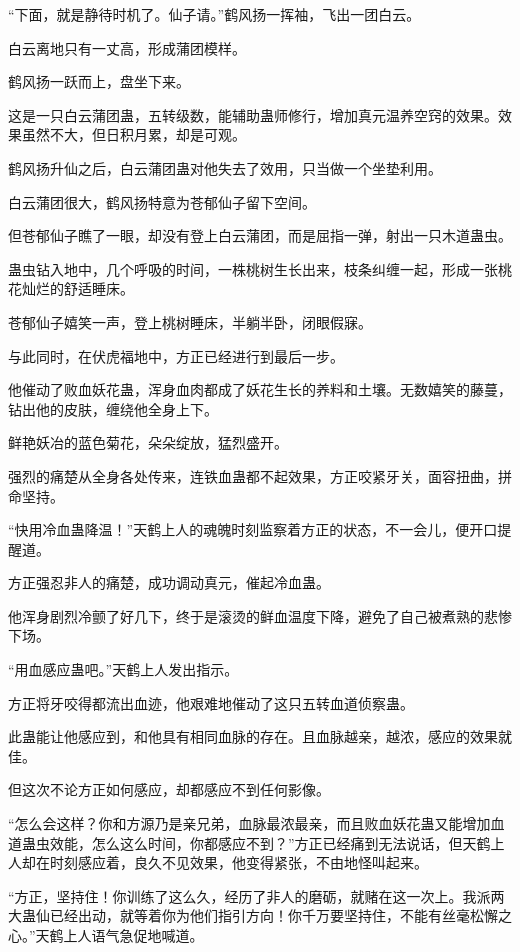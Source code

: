 \begin{this_body}
“下面，就是静待时机了。仙子请。”鹤风扬一挥袖，飞出一团白云。

白云离地只有一丈高，形成蒲团模样。

鹤风扬一跃而上，盘坐下来。

这是一只白云蒲团蛊，五转级数，能辅助蛊师修行，增加真元温养空窍的效果。效果虽然不大，但日积月累，却是可观。

鹤风扬升仙之后，白云蒲团蛊对他失去了效用，只当做一个坐垫利用。

白云蒲团很大，鹤风扬特意为苍郁仙子留下空间。

但苍郁仙子瞧了一眼，却没有登上白云蒲团，而是屈指一弹，射出一只木道蛊虫。

蛊虫钻入地中，几个呼吸的时间，一株桃树生长出来，枝条纠缠一起，形成一张桃花灿烂的舒适睡床。

苍郁仙子嬉笑一声，登上桃树睡床，半躺半卧，闭眼假寐。

与此同时，在伏虎福地中，方正已经进行到最后一步。

他催动了败血妖花蛊，浑身血肉都成了妖花生长的养料和土壤。无数嬉笑的藤蔓，钻出他的皮肤，缠绕他全身上下。

鲜艳妖冶的蓝色菊花，朵朵绽放，猛烈盛开。

强烈的痛楚从全身各处传来，连铁血蛊都不起效果，方正咬紧牙关，面容扭曲，拼命坚持。

“快用冷血蛊降温！”天鹤上人的魂魄时刻监察着方正的状态，不一会儿，便开口提醒道。

方正强忍非人的痛楚，成功调动真元，催起冷血蛊。

他浑身剧烈冷颤了好几下，终于是滚烫的鲜血温度下降，避免了自己被煮熟的悲惨下场。

“用血感应蛊吧。”天鹤上人发出指示。

方正将牙咬得都流出血迹，他艰难地催动了这只五转血道侦察蛊。

此蛊能让他感应到，和他具有相同血脉的存在。且血脉越亲，越浓，感应的效果就佳。

但这次不论方正如何感应，却都感应不到任何影像。

“怎么会这样？你和方源乃是亲兄弟，血脉最浓最亲，而且败血妖花蛊又能增加血道蛊虫效能，怎么这么时间，你都感应不到？”方正已经痛到无法说话，但天鹤上人却在时刻感应着，良久不见效果，他变得紧张，不由地怪叫起来。

“方正，坚持住！你训练了这么久，经历了非人的磨砺，就赌在这一次上。我派两大蛊仙已经出动，就等着你为他们指引方向！你千万要坚持住，不能有丝毫松懈之心。”天鹤上人语气急促地喊道。


\end{this_body}
